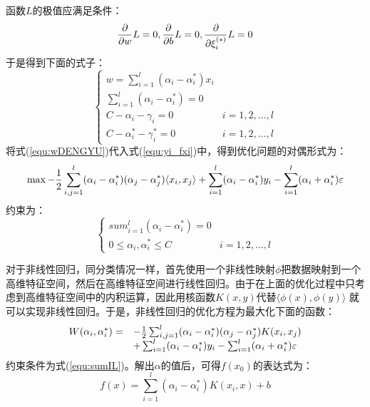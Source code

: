 函数$L$的极值应满足条件：
$$
{\partial \over \partial w }L = 0,
{\partial \over \partial b }L = 0,
{\partial \over \partial \xi _i^{(*)}}L = 0
$$
于是得到下面的式子：
\begin{equation}
\label{equ:wDENGYU}
	\left\lbrace 
		\begin{array}{ll}
		w = \sum_{i=1}^{l}(\alpha_i -\alpha_i^*) x_i &  {}  \\
		\sum_{i=1}^{l}(\alpha_i -\alpha_i^*) = 0 &  {}\\
		C-\alpha_i-\gamma_i = 0 &  i=1,2,\dots,l\\
		C-\alpha_i^*-\gamma_i^* = 0 & i=1,2,\dots,l
		\end{array}
	\right. 
\end{equation}
将式(\ref{equ:wDENGYU})代入式(\ref{equ:yi_fxi})中，得到优化问题的对偶形式为：
\begin{equation}
	\max -{1\over 2} \sum_{i,j=1}^{l}(\alpha_i-\alpha_i^*)(\alpha_j-\alpha_j^*)
	\langle x_i,x_j \rangle	+\sum_{i=1}^{l}(\alpha_i-\alpha_i^*)y_i
	-\sum_{i=1}^{l}(\alpha_i+\alpha_i^*)\varepsilon
\end{equation}
约束为：
\begin{equation}
\label{equ:sumIL}
	\left\lbrace 
		\begin{array}{ll}
		 sum_{i=1}^{l} (\alpha_i - \alpha_i^*) = 0&  {}  \\
		0\leqslant \alpha_i,\alpha_i^* \leqslant C & i=1,2,\dots,l
		\end{array}
	\right. 
\end{equation}

对于非线性回归，同分类情况一样，首先使用一个非线性映射$\phi$把数据映射到一个高维特征空间，然后在高维特征空间进行线性回归。由于在上面的优化过程中只考虑到高维特征空间中的内积运算，因此用核函数$K(x,y)$代替$\langle \phi(x),\phi(y)  \rangle$ 就可以实现非线性回归。于是，非线性回归的优化方程为最大化下面的函数：
\begin{equation}
	\begin{array}{cl}
	W(\alpha_i,\alpha_i^*) = & -{1\over 2} \sum_{i,j=1}^{l}(\alpha_i-\alpha_i^*)(\alpha_j-\alpha_j^*)K(x_i,x_j)\\
	{} & +\sum_{i=1}^{l}(\alpha_i-\alpha_i^*)y_i - \sum_{i=1}^{l}(\alpha_i+\alpha_i^*)\varepsilon
	\end{array}
\end{equation}
约束条件为式(\ref{equ:sumIL})。解出$\alpha$的值后，可得$f(x_0)$的表达式为：
\begin{equation}
	f(x) = \sum_{i=1}^{l}(\alpha_i-\alpha_i^*)K(x_i,x) + b
\end{equation}

